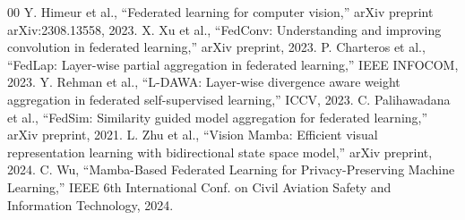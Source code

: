\documentclass[conference]{IEEEtran}
\begin{document}
\begin{thebibliography}{00}
 Y. Himeur et al., ``Federated learning for computer vision,'' arXiv preprint arXiv:2308.13558, 2023.
 X. Xu et al., ``FedConv: Understanding and improving convolution in federated learning,'' arXiv preprint, 2023.
 P. Charteros et al., ``FedLap: Layer-wise partial aggregation in federated learning,'' IEEE INFOCOM, 2023.
 Y. Rehman et al., ``L-DAWA: Layer-wise divergence aware weight aggregation in federated self-supervised learning,'' ICCV, 2023.
 C. Palihawadana et al., ``FedSim: Similarity guided model aggregation for federated learning,'' arXiv preprint, 2021.
 L. Zhu et al., ``Vision Mamba: Efficient visual representation learning with bidirectional state space model,'' arXiv preprint, 2024.
 C. Wu, ``Mamba-Based Federated Learning for Privacy-Preserving Machine Learning,'' IEEE 6th International Conf. on Civil Aviation Safety and Information Technology, 2024.
\end{thebibliography}
\end{document}
